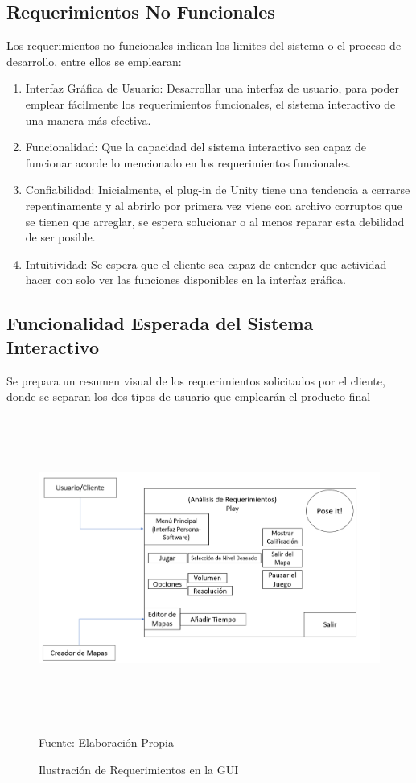 \subsection{Requerimientos No Funcionales}

Los requerimientos no funcionales indican los limites del sistema o el proceso de desarrollo, entre ellos se emplearan:

\begin{enumerate}
	\item Interfaz Gráfica de Usuario: Desarrollar una interfaz de usuario, para poder emplear fácilmente los requerimientos funcionales, el sistema interactivo de una manera más efectiva.
	\item Funcionalidad: Que la capacidad del sistema interactivo sea capaz de funcionar acorde lo mencionado en los requerimientos funcionales.
	\item Confiabilidad: Inicialmente, el plug-in de Unity tiene una tendencia a cerrarse repentinamente y al abrirlo por primera vez viene con archivo corruptos que se tienen que arreglar, se espera solucionar o al menos reparar esta debilidad de ser posible.
	\item Intuitividad: Se espera que el cliente sea capaz de entender que actividad hacer con solo ver las funciones disponibles en la interfaz gráfica.
\end{enumerate}
\newpage
\subsection{Funcionalidad Esperada del Sistema Interactivo}

Se prepara un resumen visual de los requerimientos solicitados por el cliente, donde se separan los dos tipos de usuario que emplearán el producto final

\begin{figure}[h]
	\centering
	\includegraphics[width=16cm,height=10cm,]{./Images/requerimientosgraficaposeit.png}
	\caption{Ilustración de Requerimientos en la GUI}
	\footnotesize Fuente: Elaboración Propia
	\label{requerimientosgrafico}
\end{figure}

